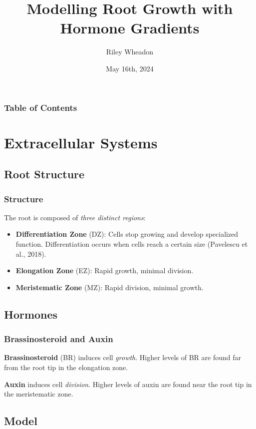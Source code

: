\documentclass{beamer}
\title{Modelling Root Growth with Hormone Gradients}
\author{Riley Wheadon}
\institute{University of British Columbia}
\date{May 16th, 2024}
\begin{document}
\frame{\titlepage}

\begin{frame}
\frametitle{Table of Contents}
\tableofcontents
\end{frame}

\section{Extracellular Systems}

\subsection{Root Structure}

\begin{frame}
\frametitle{Structure}

The root is composed of \emph{three distinct regions}:
\begin{itemize}
	\item \textbf{Differentiation Zone} (DZ): Cells stop growing and develop specialized function. Differentiation occurs when cells reach a certain size (Pavelescu et al., 2018).
	\item \textbf{Elongation Zone} (EZ): Rapid growth, minimal division.
	\item \textbf{Meristematic Zone} (MZ): Rapid division, minimal growth.
\end{itemize}

\end{frame}

\subsection{Hormones}

\begin{frame}
\frametitle{Brassinosteroid and Auxin}

\textbf{Brassinosteroid} (BR) induces cell \emph{growth}. Higher levels of BR are found far from the root tip in the elongation zone.

\bigskip

\textbf{Auxin} induces cell \emph{division}. Higher levels of auxin are found near the root tip in the meristematic zone.

\end{frame}

\subsection{Model}
\end{document}
